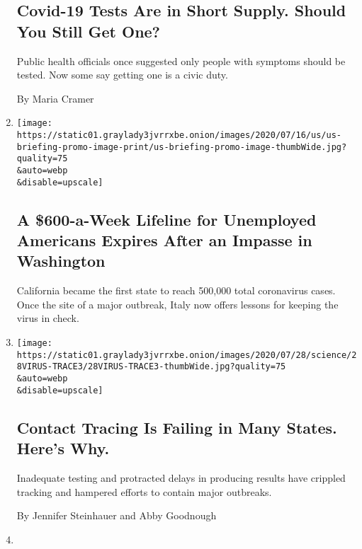 \begin{enumerate}
{  \subsection{Covid-19 Tests Are in Short Supply. Should You Still Get
  One?}\label{covid-19-tests-are-in-short-supply-should-you-still-get-one}}

  Public health officials once suggested only people with symptoms
  should be tested. Now some say getting one is a civic duty.

  By Maria Cramer
\item
  \href{/2020/07/31/world/coronavirus-covid-19.html}{}

  \texttt{[image: https://static01.graylady3jvrrxbe.onion/images/2020/07/16/us/us-briefing-promo-image-print/us-briefing-promo-image-thumbWide.jpg?quality=75\\\&auto=webp\\\&disable=upscale]}

  \hypertarget{a-600-a-week-lifeline-for-unemployed-americans-expires-after-an-impasse-in-washington}{%
  \subsection{A \$600-a-Week Lifeline for Unemployed Americans Expires
  After an Impasse in
  Washington}\label{a-600-a-week-lifeline-for-unemployed-americans-expires-after-an-impasse-in-washington}}

  California became the first state to reach 500,000 total coronavirus
  cases. Once the site of a major outbreak, Italy now offers lessons for
  keeping the virus in check.
\item
  \href{/2020/07/31/health/covid-contact-tracing-tests.html}{}

  \texttt{[image: https://static01.graylady3jvrrxbe.onion/images/2020/07/28/science/28VIRUS-TRACE3/28VIRUS-TRACE3-thumbWide.jpg?quality=75\\\&auto=webp\\\&disable=upscale]}

  \hypertarget{contact-tracing-is-failing-in-many-states-heres-why}{%
  \subsection{Contact Tracing Is Failing in Many States. Here's
  Why.}\label{contact-tracing-is-failing-in-many-states-heres-why}}

  Inadequate testing and protracted delays in producing results have
  crippled tracking and hampered efforts to contain major outbreaks.

  By Jennifer Steinhauer and Abby Goodnough
\item
  \href{/2020/07/30/health/coronavirus-children.html}{}


\end{enumerate}
